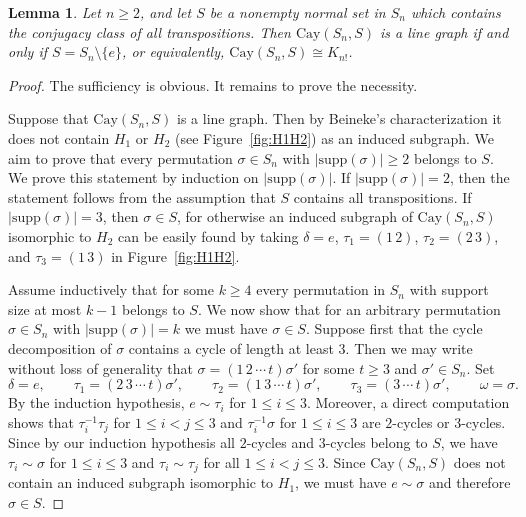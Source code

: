 \documentclass[12pt, a4paper]{article}
\newtheorem{lem}[thm]{Lemma}
\theoremstyle{definition}
\begin{document}
\begin{lem}\label{2-cycle-linegraph}
Let $n \ge 2$, and let $S$ be a nonempty normal set in $S_n$ which contains the conjugacy class of all transpositions. Then $\mathrm{Cay}(S_n, S)$ is a line graph if and only if $S = S_n \setminus \{e\}$, or equivalently, $\mathrm{Cay}(S_n, S) \cong K_{n!}$.
\end{lem}

\begin{proof}
The sufficiency is obvious. It remains to prove the necessity.

Suppose that $\mathrm{Cay}(S_n, S)$ is a line graph. Then by Beineke's characterization it does not contain $H_1$ or $H_2$ (see Figure~\ref{fig:H1H2}) as an induced subgraph.
We aim to prove that every permutation $\sigma \in S_n$ with $|\mathrm{supp}(\sigma)| \ge 2$ belongs to $S$. We prove this statement by induction on $|\mathrm{supp}(\sigma)|$. If $|\mathrm{supp}(\sigma)|=2$, then the statement follows from the assumption that $S$ contains all transpositions. If $|\mathrm{supp}(\sigma)|=3$, then $\sigma \in S$, for otherwise an induced subgraph of $\mathrm{Cay}(S_n, S)$ isomorphic to $H_2$ can be easily found by taking $\delta=e$, $\tau_1=(1\,2)$, $\tau_2=(2\,3)$, and $\tau_3=(1\,3)$ in Figure~\ref{fig:H1H2}.

Assume inductively that for some $k \ge 4$ every permutation in $S_n$ with support size at most $k-1$ belongs to $S$. We now show that for an arbitrary permutation $\sigma \in S_n$ with $|\mathrm{supp}(\sigma)|=k$ we must have $\sigma \in S$. Suppose first that the cycle decomposition of $\sigma$ contains a cycle of length at least $3$. Then we may write without loss of generality that
\(
\sigma=(1\,2\,\cdots\,t)\sigma'
\)
for some $t\ge 3$ and $\sigma' \in S_n$. Set
\[
\delta=e,\qquad
\tau_1=(2\,3\,\cdots\,t)\sigma',\qquad
\tau_2=(1\,3\,\cdots\,t)\sigma',\qquad
\tau_3=(3\,\cdots\,t)\sigma',\qquad
\omega=\sigma.
\]
By the induction hypothesis, $e \sim \tau_i$ for $1\le i\le 3$. Moreover, a direct computation shows that $\tau_i^{-1}\tau_j$ for $1\le i<j\le 3$ and $\tau_i^{-1}\sigma$ for $1\le i\le 3$ are $2$-cycles or $3$-cycles. Since by our induction hypothesis all $2$-cycles and $3$-cycles belong to $S$, we have $\tau_i \sim \sigma$ for $1\le i\le 3$ and $\tau_i\sim\tau_j$ for all $1\le i<j\le 3$. Since $\mathrm{Cay}(S_n,S)$ does not contain an induced subgraph isomorphic to $H_1$, we must have $e\sim\sigma$ and therefore $\sigma\in S$.


\end{proof}
\end{document}
